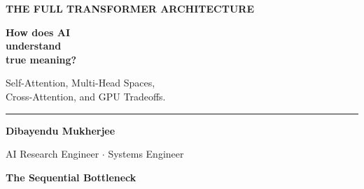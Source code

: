 \documentclass[11pt]{article}
\begin{document}
\thispagestyle{empty}
\vspace*{0.8in}

\begin{center}

    {\fontsize{14}{16}\selectfont\color{brandblue}\textbf{
    THE FULL TRANSFORMER ARCHITECTURE
    }}

    \vspace{0.8in}

    {\fontsize{40}{48}\selectfont\color{brandnavy}\bfseries
    How does AI\\
    understand\\
    true meaning?
    }

    \vspace{0.6in}

    {\fontsize{18}{24}\selectfont\color{brandgray}
    Self-Attention, Multi-Head Spaces,\\
    Cross-Attention, and GPU Tradeoffs.
    }

    \vfill

    \begin{minipage}{0.8\textwidth}
        \centering
        \rule{0.6\linewidth}{0.5pt}

        \vspace{0.2in}

        {\fontsize{12}{14}\selectfont\color{brandnavy}
        \textbf{Dibayendu Mukherjee}
        }

        \vspace{0.05in}

        {\fontsize{10}{12}\selectfont\color{brandgray}
        AI Research Engineer \quad $\cdot$ \quad Systems Engineer
        }

    \end{minipage}

\end{center}

\newpage

\vspace*{0.4in}

\begin{center}
{\fontsize{26}{30}\selectfont\color{brandnavy}\bfseries 
The Sequential Bottleneck}
\end{center}
\end{document}
